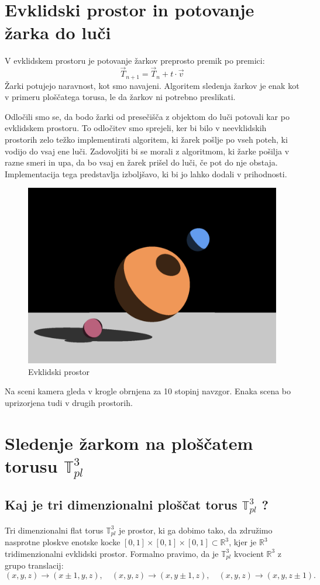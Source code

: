 \documentclass[titlepage]{article}
\begin{document}
\section{Evklidski prostor in potovanje žarka do luči}

V evklidskem prostoru je potovanje žarkov preprosto premik po premici: 
\[ \vec{T}_{n+1} = \vec{T}_{n} + t \cdot \vec{v} \]
Žarki potujejo naravnost, kot smo navajeni. Algoritem sledenja žarkov je enak 
kot v primeru ploščatega torusa, le da žarkov ni potrebno preslikati. 

Odločili smo se, da bodo žarki od presečišča z objektom do luči potovali kar po evklidskem prostoru. 
To odločitev smo sprejeli, ker bi bilo v neevklidskih prostorih zelo težko implementirati algoritem, 
ki žarek pošlje po vseh poteh, ki vodijo do vsaj ene luči. Zadovoljiti bi se morali z algoritmom,
ki žarke pošilja v razne smeri in upa, da bo vsaj en žarek prišel do luči, če pot do nje obstaja. 
Implementacija tega predstavlja izboljšavo, ki bi jo lahko dodali v prihodnosti.

\begin{figure}[H]
  \centering
  \includegraphics[width=0.8\linewidth]{Images/Euclidean_24mm.png}
  \caption{Evklidski prostor}
  \label{Slika:Euklidski prostor}
\end{figure}

Na sceni kamera gleda v krogle obrnjena za 10 stopinj navzgor. Enaka scena 
bo uprizorjena tudi v drugih prostorih.

\section{\texorpdfstring{Sledenje žarkom na ploščatem torusu \( \mathbb{T}_{pl}^{3} \)}{Sledenje žarkom na flat torusu}}

\subsection{Kaj je tri dimenzionalni ploščat torus \( \mathbb{T}_{pl}^{3} \) ?}
Tri dimenzionalni flat torus \( \mathbb{T}^3_{pl} \) je prostor, ki ga dobimo tako, da združimo nasprotne ploskve enotske kocke \([0,1] \times [0,1] \times [0,1] \subset \mathbb{R}^3 \), kjer je \(\mathbb{R}^3\) tridimenzionalni evklidski prostor. Formalno pravimo, da je \( \mathbb{T}^3_{pl} \) kvocient \(\mathbb{R}^3\) z grupo translacij:
\[
(x, y, z) \to (x \pm 1, y, z), \quad (x, y, z) \to (x, y \pm 1, z), \quad (x, y, z) \to (x, y, z \pm 1).
\]
\end{document}
